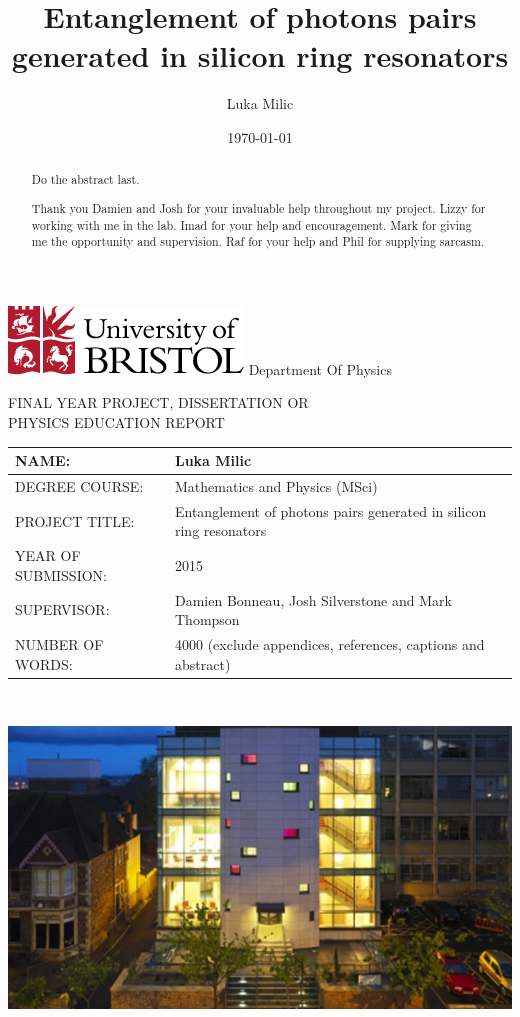 \documentclass[11pt]{article}
\title{Entanglement of photons pairs generated in silicon ring resonators}
\date{\today}
\author{Luka Milic}
\numberwithin{equation}{section}
\numberwithin{figure}{section}
\begin{document}
\begin{titlepage}
  \includegraphics[scale=0.6]{img/uob-logo.png}\hfill
  \LARGE Department Of Physics \\
  \begin{center}
    FINAL YEAR PROJECT, DISSERTATION OR\\
    PHYSICS EDUCATION REPORT
  \end{center} 

  \large
  {\renewcommand{\arraystretch}{2}%
  \begin{tabular}[t]{|l|p{10cm}|}
    \hline
    NAME: & Luka Milic \\ \hline
    DEGREE COURSE: & Mathematics and Physics (MSci)\\ \hline
    PROJECT TITLE: & Entanglement of photons pairs generated in silicon ring resonators \\ \hline
    YEAR OF SUBMISSION: & 2015\\ \hline
    SUPERVISOR: & Damien Bonneau, Josh Silverstone and Mark Thompson\\ \hline
    NUMBER OF WORDS: & 4000 (exclude appendices, references, captions and abstract)\\ \hline
  \end{tabular} } \quad
  \\[1.5cm]
  \begin{center}
    \includegraphics[scale=0.7]{img/nsqi.jpg}
  \end{center}
\end{titlepage}
\newpage
\maketitle
\begin{abstract}
Do the abstract last.
\end{abstract}
\newpage
\renewcommand{\abstractname}{Acknowledgements}
\newpage
\begin{abstract}
Thank you Damien and Josh for your invaluable help throughout my project. Lizzy for working with me in the lab. Imad for your help and encouragement. Mark for giving me the opportunity and supervision. Raf for your help and  Phil for supplying sarcasm. 
\end{abstract}
\end{document}
